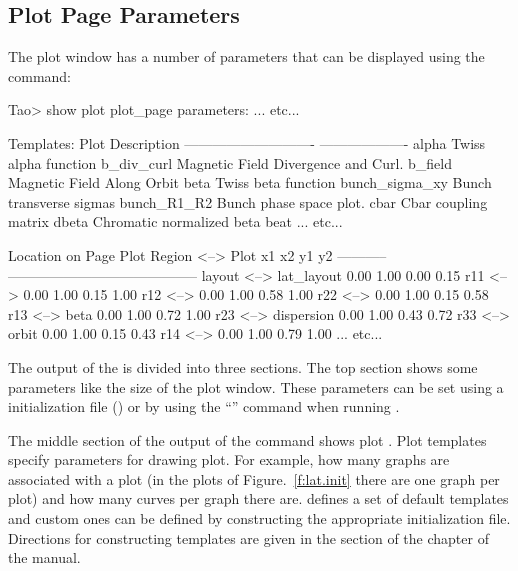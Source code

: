 \documentclass{hitec}
\begin{document}
\subsection{Plot Page Parameters}

The plot window has a number of parameters that can be displayed using the 
command:

\begin{code}
Tao> show plot
plot_page parameters:
... etc...

Templates:
   Plot                                    Description
   ----------------------------            -------------------
   alpha                                   Twiss alpha function
   b_div_curl                              Magnetic Field Divergence and Curl.
   b_field                                 Magnetic Field Along Orbit
   beta                                    Twiss beta function
   bunch_sigma_xy                          Bunch transverse sigmas
   bunch_R1_R2                             Bunch phase space plot.
   cbar                                    Cbar coupling matrix
   dbeta                                   Chromatic normalized beta beat
... etc...

                                               Location on Page
Plot Region         <-->  Plot                 x1    x2    y1    y2
-----------               -----------------------------------------
layout              <-->  lat_layout          0.00  1.00  0.00  0.15
r11                 <-->                      0.00  1.00  0.15  1.00
r12                 <-->                      0.00  1.00  0.58  1.00
r22                 <-->                      0.00  1.00  0.15  0.58
r13                 <-->  beta                0.00  1.00  0.72  1.00
r23                 <-->  dispersion          0.00  1.00  0.43  0.72
r33                 <-->  orbit               0.00  1.00  0.15  0.43
r14                 <-->                      0.00  1.00  0.79  1.00
... etc...
\end{code}
The output of the  is divided into three sections. The top section
shows some parameters like the size of the plot window. These parameters can be 
set using a \tao initialization file () or by using the ``''
command when running \tao.

The middle section of the output of the  command shows plot .
Plot templates specify parameters for drawing plot. For example, how many graphs are
associated with a plot (in the plots of Figure.~\ref{f:lat.init} there are one graph per plot)
and how many curves per graph there are. \tao defines a set of default templates and custom
ones can be defined by constructing the appropriate initialization file. Directions for
constructing templates are given in the  section of the  chapter of the \tao manual.
\end{document}
